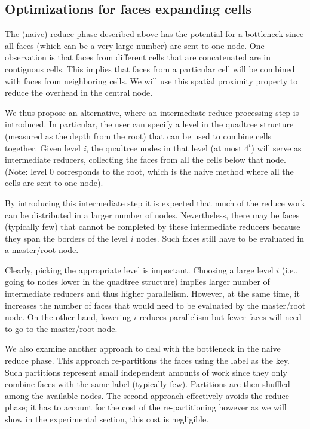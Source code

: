 \subsection{Optimizations for faces expanding cells}\label{sec:optimizing}

The (naive) reduce phase described above has the potential for a bottleneck since all faces (which can be a very large number) are sent to one node.
One observation is that faces from different cells that are concatenated are in contiguous cells. 
This implies that faces from a particular cell will be combined with faces from neighboring cells.
We will use this spatial proximity property to reduce the overhead in the central node.


We thus propose an alternative, where an intermediate reduce processing step is introduced.
In particular, the user can specify a level in the quadtree structure (measured as the depth from the root) that can be used to combine cells together. 
Given level \textit{i}, the quadtree nodes in that level (at most $4^i$) will serve as intermediate reducers, collecting the faces from all the cells below that node. (Note: level 0 corresponds to the root, which is the naive method where all the cells are sent to one node).

By introducing this intermediate step it is expected that much of the reduce work can be distributed in a larger number of nodes.
Nevertheless, there may be faces (typically few) that cannot be completed by these intermediate reducers because they span the borders of the level $i$ nodes. 
Such faces still have to be evaluated in a master/root node.

Clearly, picking the appropriate level is important. 
Choosing a large level $i$ (i.e., going to nodes lower in the quadtree structure) implies larger number of intermediate reducers and thus higher parallelism.
However, at the same time, it increases the number of faces that would need to be evaluated by the master/root node.  
On the other hand, lowering $i$ reduces parallelism but fewer faces will need to go to the master/root node.

We also examine another approach to deal with the bottleneck in the naive reduce phase. 
This approach re-partitions the faces using the label as the key. 
Such partitions represent small independent amounts of work since they only combine faces with the same label (typically few).
Partitions are then shuffled among the available nodes.  
The second approach effectively avoids the reduce phase; it has to account for the cost of the re-partitioning however as we will show in the experimental section, this cost is negligible.

